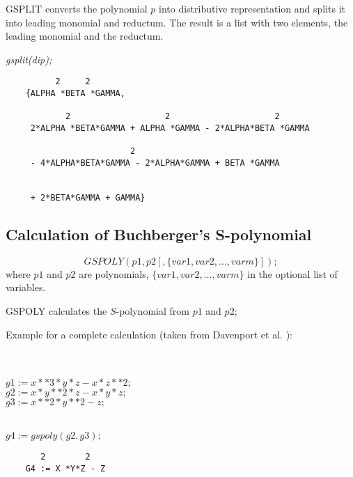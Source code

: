 GSPLIT converts the polynomial $p$ into distributive representation
and splits it into leading monomial and reductum. The result is a list
with two elements, the leading monomial and the reductum.

\example {}

{\it gsplit(dip); }
\begin{verbatim}
          2     2
    {ALPHA *BETA *GAMMA,

            2                   2                     2
     2*ALPHA *BETA*GAMMA + ALPHA *GAMMA - 2*ALPHA*BETA *GAMMA

                         2
     - 4*ALPHA*BETA*GAMMA - 2*ALPHA*GAMMA + BETA *GAMMA


     + 2*BETA*GAMMA + GAMMA}

 \end{verbatim}

\subsection{Calculation of Buchberger's S-polynomial}
\[
GSPOLY (p1,p2[,\{var1, var2, \ldots , varm\}]);
\]
where $p1$  and $p2$ are polynomials, $\{var1, var2, \ldots ,
varm\}$ in the optional list of variables.

GSPOLY calculates the $S$-polynomial from $p1$  and $p2$;

Example for a complete calculation (taken from {\sc Davenport et al.}
 \cite{Davenport:88a}):

\hspace*{+1cm}{\it \%  initial system} \\
\hspace*{+1cm}{\it korder x,y,z; torder lex;} \\
\hspace*{+1cm} $g1  :=  x**3*y*z - x*z**2;$\\
\hspace*{+1cm} $g2  :=  x*y**2*z - x*y*z; $ \\
\hspace*{+1cm} $g3  :=  x**2*y**2 - z;$

\hspace*{+1cm}{\it \% first S-polynomial} \\
\hspace*{+1cm} $g4  :=  gspoly(g2,g3);$

\begin{verbatim}
       2        2
    G4 := X *Y*Z - Z
 \end{verbatim}

